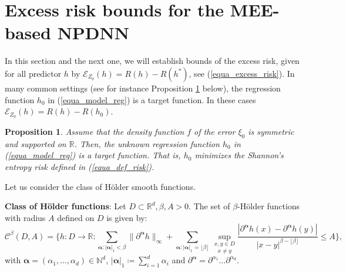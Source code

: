 \documentclass[10pt,twoside]{article}
\numberwithin{equation}{section}
\newtheorem{prop}[thm]{Proposition}
\newcommand{\R}{\ensuremath{\mathbb{R}}}
\newcommand{\N}{\ensuremath{\mathbb{N}}}
\begin{document}
 

\section{Excess risk bounds for the MEE-based NPDNN}\label{excess_NPDNN}
%
In this section and the next one, we will establish bounds of the excess risk, given for all predictor $h$ by $\mathcal{E}_{Z_0}(h) = R(h) - R(h^{*})$, see (\ref{equa_excess_risk}).
%
In many common settings (see for instance Proposition \ref{prop_minimizer_risk} below), the regression function $h_0$ in (\ref{equa_model_reg}) is a target function. In these cases $\mathcal{E}_{Z_0}(h) = R(h) - R(h_0)$. 
%

\medskip

\begin{prop}\label{prop_minimizer_risk}
    Assume that the density function $f$ of the error $\xi_0$ is symmetric and supported on $\R$. Then, the unknown regression function $h_0$ in (\ref{equa_model_reg}) is a target function. That is, $h_0$ minimizes the Shannon's entropy risk defined in (\ref{equa_def_risk}).
\end{prop}
%

\noindent
Let us consider the class of H\"older smooth functions.
\medskip

\noindent
\textbf{Class of H\"older functions}: Let $ D\subset \R^d, \beta, A >0$. The set of $\beta$-H\"older functions with radius $A$ defined on $D$ is given by:
%
\begin{equation}\label{equa_ball_Holder}
 \mathcal{C}^{\beta}(D, A)= \Bigg\{h : D \rightarrow \R : \underset{\boldsymbol{\alpha} : |\boldsymbol{\alpha}|_1 < \beta}{\sum}\|\partial^{\boldsymbol{\alpha}}h\|_{\infty} + \underset{\boldsymbol{\alpha} : |\boldsymbol{\alpha}|_1 = \lfloor \beta \rfloor}{\sum}~\underset{x\ne y}{\underset{x, y\in D}{\sup}} \frac{|\partial^{\boldsymbol{\alpha}}h(x) - \partial^{\boldsymbol{\alpha}}h(y)|}{|x - y|^{\beta - \lfloor \beta \rfloor}} \leq A \Bigg\},  
\end{equation}
%
with $\boldsymbol{\alpha} = (\alpha_1, \dots, \alpha_d)\in \N^d$, $|\boldsymbol{\alpha}|_1 \coloneqq \sum_{i=1}^d \alpha_i$ and $\partial^{\boldsymbol{\alpha}} = \partial^{\alpha_1} \dots \partial^{\alpha_d}$.

 
\medskip
\end{document}
